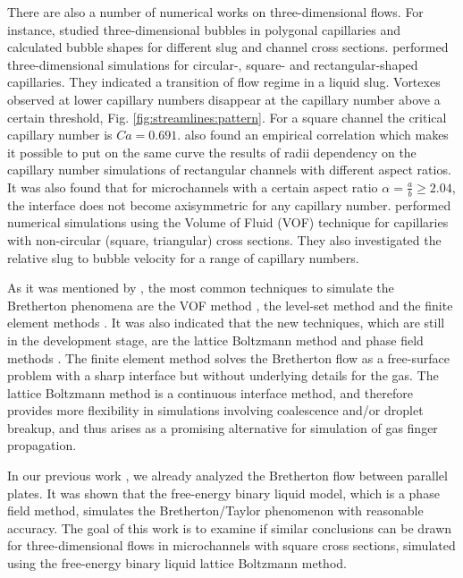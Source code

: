\documentclass[preprint,12pt]{elsarticle}
\begin{document}
There are also a number of numerical works on three-dimensional flows. For instance, 
\citet{wong-films,wong-pressure} studied
three-dimensional bubbles in
polygonal capillaries and calculated bubble shapes for different
slug and channel cross sections.
\citet{heil-threedim} performed three-dimensional simulations for circular-,
square- and rectangular-shaped capillaries. They indicated a transition of flow regime in a liquid
slug. Vortexes observed at lower capillary numbers disappear at the capillary number above a
certain threshold,  Fig. \ref{fig:streamlines:pattern}. For a square channel the critical
capillary number is $Ca=0.691$.  \citet{heil-threedim} also found an empirical
correlation which
makes it possible to put on the same curve the results of radii dependency on the capillary number
simulations of rectangular channels with different aspect ratios.
It was also found that for microchannels with a certain aspect ratio $\alpha=\frac{a}{b}\geq
2.04$, the interface does not become
axisymmetric for any capillary number. \citet{wang-non-circular} performed numerical
simulations using the Volume of Fluid (VOF) technique for
capillaries with non-circular (square, triangular) cross sections. They also investigated the
relative slug to bubble velocity for
a range of capillary numbers. 

As it was mentioned by \citet{gupta-review}, the most common techniques to simulate the Bretherton
phenomena are the VOF method \cite{wang-non-circular}, the level-set method
\cite{fukugata-levelset} and the finite element methods \cite{kreutzer-taylor,heil-threedim}. It was
also indicated \cite{gupta-review} that the new techniques, which are still in the development
stage,
are the lattice Boltzmann method and phase field methods \cite{anderson-diffuse,gurtin-binary}.
The finite element method solves the Bretherton flow as a free-surface problem with a sharp
interface but without underlying details for the gas.  The lattice Boltzmann method is a continuous
interface method, and therefore provides more flexibility in simulations involving coalescence
and/or
droplet breakup, and thus arises as a promising alternative for simulation of gas finger propagation. 

In our previous work \cite{kuzmin-binary2d}, we already analyzed the Bretherton flow between
parallel
plates.
It was shown that the free-energy binary liquid model, which is a phase field method, simulates the
Bretherton/Taylor phenomenon with reasonable accuracy. The goal of this work is to examine 
if similar conclusions can be drawn for three-dimensional flows in microchannels with square cross
sections,
simulated using the free-energy binary liquid lattice Boltzmann
method. 
\end{document}
